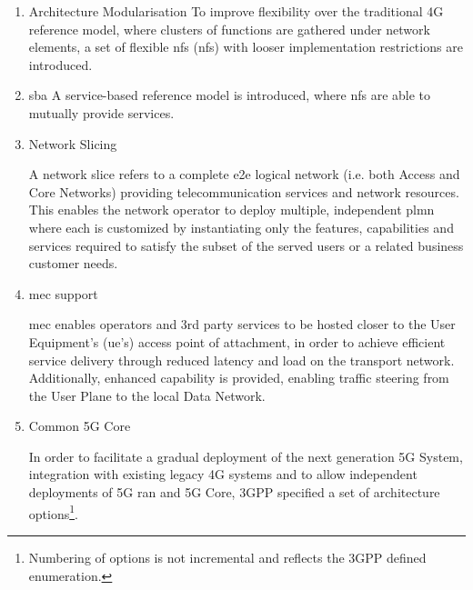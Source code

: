         \renewcommand{\theenumi}{\Roman{enumi}}
        \begin{enumerate}
        
        \item Architecture Modularisation \newline
        To improve flexibility over the traditional 4G reference model, where clusters of functions are gathered under network elements, a set of flexible \acrlong{nf}s (\acrshort{nf}s) with looser implementation restrictions are introduced. 

        \item \acrfull{sba} \newline
        A service-based reference model is introduced, where \acrshort{nf}s are able to mutually provide services.

        \item Network Slicing
        
        A network slice refers to a complete \acrshort{e2e} logical network (i.e. both Access and Core Networks) providing telecommunication services and network resources. This enables the network operator to deploy multiple, independent \acrfull{plmn} where each is customized by instantiating only the features, capabilities and services required to satisfy the subset of the served users or a related business customer needs.

        \item \acrfull{mec} support
        
        \acrshort{mec} enables operators and 3rd party services to be hosted closer to the User Equipment's (\acrshort{ue}'s) access point of attachment, in order to achieve efficient service delivery through reduced latency and load on the transport network. Additionally, enhanced capability is provided, enabling traffic steering from the User Plane to the local Data Network.
        \item Common 5G Core
        
        In order to facilitate a gradual deployment of the next generation 5G System, integration with existing legacy 4G systems and to allow independent deployments of 5G \acrshort{ran} and 5G Core, 3GPP specified a set of architecture options\footnote{Numbering of options is not incremental and reflects the 3GPP defined enumeration.}.%
        

\end{enumerate}
